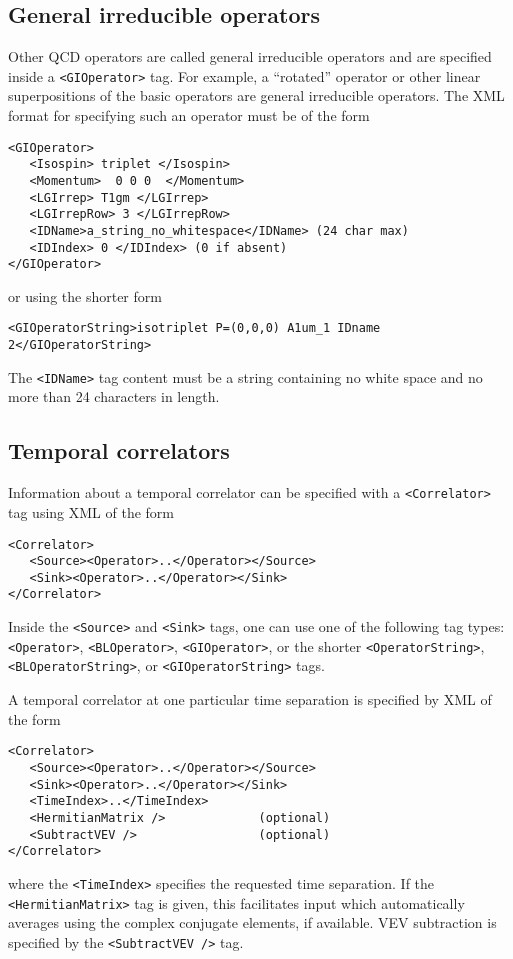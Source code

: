 \documentclass[12pt]{article}
\newcommand{\vb}{\texttt}
\begin{document}
\subsection{General irreducible operators}

Other QCD operators are called general irreducible operators
and are specified inside a \vb{<GIOperator>} tag. For example,
a ``rotated'' operator or other linear superpositions of the
basic operators are general irreducible operators.  The XML
format for specifying such an operator must be of the form
\begin{verbatim}
<GIOperator>
   <Isospin> triplet </Isospin>
   <Momentum>  0 0 0  </Momentum>
   <LGIrrep> T1gm </LGIrrep>
   <LGIrrepRow> 3 </LGIrrepRow>
   <IDName>a_string_no_whitespace</IDName> (24 char max)
   <IDIndex> 0 </IDIndex> (0 if absent)
</GIOperator>
\end{verbatim}
or using the shorter form
\begin{verbatim}
<GIOperatorString>isotriplet P=(0,0,0) A1um_1 IDname 2</GIOperatorString>
\end{verbatim}
The \vb{<IDName>} tag content must be a string containing no white space
and no more than 24 characters in length.


\subsection{Temporal correlators}

Information about a temporal correlator can be specified with a
\vb{<Correlator>} tag using XML of the form
\begin{verbatim}
<Correlator>
   <Source><Operator>..</Operator></Source>
   <Sink><Operator>..</Operator></Sink>
</Correlator>
\end{verbatim}
Inside the \vb{<Source>} and \vb{<Sink>} tags, one can use one of
the following tag types:
\vb{<Operator>}, \vb{<BLOperator>}, \vb{<GIOperator>}, or the shorter
\vb{<OperatorString>}, \vb{<BLOperatorString>}, or
\vb{<GIOperatorString>} tags.

A temporal correlator at one particular time separation is specified
by XML of the form
\begin{verbatim}
<Correlator>
   <Source><Operator>..</Operator></Source>
   <Sink><Operator>..</Operator></Sink>
   <TimeIndex>..</TimeIndex>
   <HermitianMatrix />             (optional)
   <SubtractVEV />                 (optional)
</Correlator>
\end{verbatim}
where the \vb{<TimeIndex>} specifies the requested time separation.
If the \vb{<HermitianMatrix>} tag is given, this facilitates
input which automatically averages using the complex conjugate
elements, if available.  VEV subtraction is specified by the
\vb{<SubtractVEV />} tag.
\end{document}
